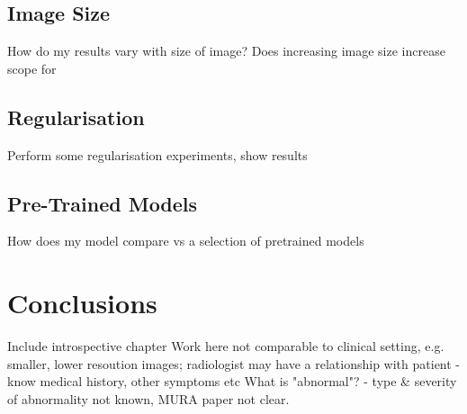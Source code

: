 \documentclass[11pt]{article} %
\theoremstyle{plain}
\theoremstyle{definition}
\begin{document}
\subsection{Image Size}
How do my results vary with size of image? Does increasing image size increase scope for

\subsection{Regularisation}
Perform some regularisation experiments, show results

\subsection{Pre-Trained Models}
How does my model compare vs a selection of pretrained models



\newpage
\section{Conclusions}
Include introspective chapter
Work here not comparable to clinical setting, e.g. smaller, lower resoution images; radiologist may have a relationship with patient - know medical history, other symptoms etc
What is "abnormal"? - type \& severity of abnormality not known, MURA paper not clear.



\newpage
\end{document}
